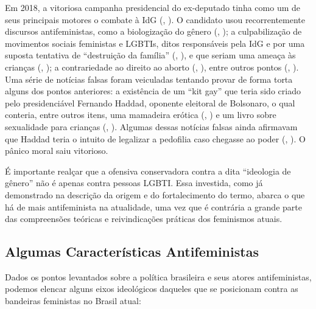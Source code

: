 \documentclass[
	12pt,				%
	openright,			%
	twoside,			%
	a4paper,			%
	english,			%
	brazil				%
	]{abntex2}
\begin{document}
 Em 2018, a vitoriosa campanha presidencial do ex-deputado tinha como um de seus principais motores o combate à IdG (, \citeyear{saldana2018}). O candidato usou recorrentemente discursos antifeministas, como a biologização do gênero (, \citeyear{rangel2018}); a culpabilização de movimentos sociais feministas e LGBTIs, ditos responsáveis pela IdG e por uma suposta tentativa de “destruição da família” (, \citeyear{pontes2017}), e que seriam uma ameaça às crianças (, \citeyear{pires2018}); a contrariedade ao direito ao aborto (, \citeyear{matsui2018}), entre outros pontos (, \citeyear{rossi2020}). Uma série de notícias falsas foram veiculadas tentando provar de forma torta alguns dos pontos anteriores: a existência de um “kit gay” que teria sido criado pelo presidenciável Fernando Haddad, oponente eleitoral de Bolsonaro, o qual conteria, entre outros itens, uma mamadeira erótica (, \citeyear{verifica2018}) e um livro sobre sexualidade para crianças (, \citeyear{cunha2018}). Algumas dessas notícias falsas ainda afirmavam que Haddad teria o intuito de legalizar a pedofilia caso chegasse ao poder (, \citeyear{menezes2018}). O pânico moral saiu vitorioso.

 É importante realçar que a ofensiva conservadora contra a dita “ideologia de gênero” não é apenas contra pessoas LGBTI. Essa investida, como já demonstrado na descrição da origem e do fortalecimento do termo, abarca o que há de mais antifeminista na atualidade, uma vez que é contrária a grande parte das compreensões teóricas e reivindicações práticas dos feminismos atuais.
 
 \subsection{Algumas Características Antifeministas}\label{caractantifem}
 Dados os pontos levantados sobre a política brasileira e seus atores antifeministas, podemos elencar alguns eixos ideológicos daqueles que se posicionam contra as bandeiras feministas no Brasil atual:
 
\end{document}

